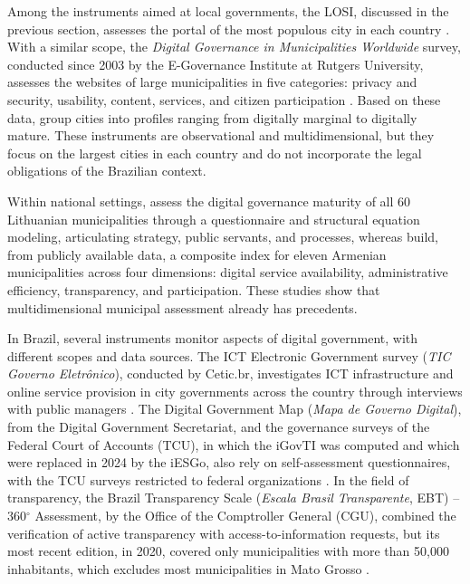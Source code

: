 \documentclass[12pt]{article}
\begin{document}
Among the instruments aimed at local governments, the LOSI, discussed in the previous section, assesses the portal of the most populous city in each country \cite{un2024egovernment}. With a similar scope, the \textit{Digital Governance in Municipalities Worldwide} survey, conducted since 2003 by the E-Governance Institute at Rutgers University, assesses the websites of large municipalities in five categories: privacy and security, usability, content, services, and citizen participation \cite{holzer2016digital}. Based on these data, \cite{manoharan2017global} group cities into profiles ranging from digitally marginal to digitally mature. These instruments are observational and multidimensional, but they focus on the largest cities in each country and do not incorporate the legal obligations of the Brazilian context. 

Within national settings, \cite{toleikiene2025assessing} assess the digital governance maturity of all 60 Lithuanian municipalities through a questionnaire and structural equation modeling, articulating strategy, public servants, and processes, whereas \cite{mkhitaryan2026digital} build, from publicly available data, a composite index for eleven Armenian municipalities across four dimensions: digital service availability, administrative efficiency, transparency, and participation. These studies show that multidimensional municipal assessment already has precedents.

In Brazil, several instruments monitor aspects of digital government, with different scopes and data sources. The ICT Electronic Government survey (\textit{TIC Governo Eletrônico}), conducted by Cetic.br, investigates ICT infrastructure and online service provision in city governments across the country through interviews with public managers \cite{cgi2024ticgov}. The Digital Government Map (\textit{Mapa de Governo Digital}), from the Digital Government Secretariat, and the governance surveys of the Federal Court of Accounts (TCU), in which the iGovTI was computed and which were replaced in 2024 by the iESGo, also rely on self-assessment questionnaires, with the TCU surveys restricted to federal organizations \cite{sgd2022mapa, tcu2024iesgo}. In the field of transparency, the Brazil Transparency Scale (\textit{Escala Brasil Transparente}, EBT) -- 360$^{\circ}$ Assessment, by the Office of the Comptroller General (CGU), combined the verification of active transparency with access-to-information requests, but its most recent edition, in 2020, covered only municipalities with more than 50,000 inhabitants, which excludes most municipalities in Mato Grosso \cite{cgu2020ebt}. 
\end{document}
